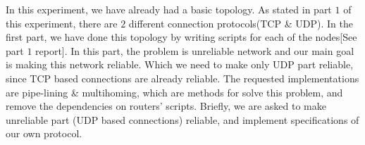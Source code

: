 In this experiment, we have already had a basic topology. As stated in part $1$ of this experiment, there are $2$ different connection protocols(TCP \& UDP). In the first part, we have done this topology by writing scripts for each of the nodes[See part $1$ report]. In this part, the problem is unreliable network and our main goal is making this network reliable. Which we need to make only UDP part reliable, since TCP based connections are already reliable. The requested implementations are pipe-lining \& multihoming, which are methods for solve this problem, and remove the dependencies on routers' scripts. Briefly, we are asked to make unreliable part (UDP based connections) reliable, and implement specifications of our own protocol.
\newpage
